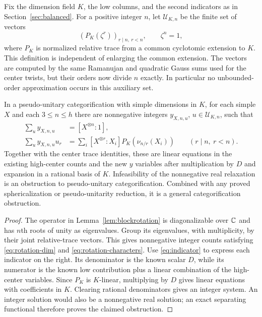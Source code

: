 Fix the dimension field $K$, the low columns, and the second indicators
as in Section~\ref{sec:balanced}. For a positive integer $n$, let
$\mathcal U_{K,n}$ be the finite set of vectors
\[
 (P_K(\zeta^r))_{r\mid n,\ r<n},\qquad \zeta^n=1,
\]
where $P_K$ is normalized relative trace from a common cyclotomic
extension to $K$. This definition is independent of enlarging the common
extension. The vectors are computed by the same Ramanujan and quadratic
Gauss sums used for the center twists, but their orders now divide $n$
exactly. In particular no unbounded-order approximation occurs in this
auxiliary set.

\begin{theorem}\label{thm:rotation}
In a pseudo-unitary categorification with simple dimensions in $K$, for
each simple $X$ and each $3\le n\le h$ there are nonnegative integers
$y_{X,n,u}$, $u\in\mathcal U_{K,n}$, such that
\begin{align}
 \sum_u y_{X,n,u}&=[X^{\otimes n}:1],\label{eq:rotation-dim}\\
 \sum_u y_{X,n,u}u_r
 &=\sum_i[X^{\otimes r}:X_i]P_K(\nu_{n/r}(X_i))
       \qquad(r\mid n,\ r<n).\label{eq:rotation-characters}
\end{align}
Together with the center trace identities, these are linear equations
in the existing high-center counts and the new $y$ variables after
multiplication by $D$ and expansion in a rational basis of $K$.
Infeasibility of the nonnegative real relaxation is an obstruction to
pseudo-unitary categorification. Combined with any proved
sphericalization or pseudo-unitarity reduction, it is a general
categorification obstruction.
\end{theorem}
\begin{proof}
The operator in Lemma~\ref{lem:blockrotation} is diagonalizable over
$\mathbb C$ and has $n$th roots of unity as eigenvalues. Group its eigenvalues,
with multiplicity, by their joint relative-trace vectors. This gives
nonnegative integer counts satisfying \eqref{eq:rotation-dim} and
\eqref{eq:rotation-characters}. Use \eqref{eq:indicator} to express each
indicator on the right. Its denominator is the known scalar $D$, while
its numerator is the known low contribution plus a linear combination
of the high-center variables. Since $P_K$ is $K$-linear, multiplying by
$D$ gives linear equations with coefficients in $K$. Clearing rational
denominators gives an integer system. An integer solution would also be
a nonnegative real solution; an exact separating functional therefore
proves the claimed obstruction.
\end{proof}


